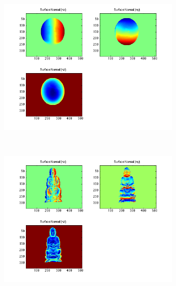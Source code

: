 \documentclass{paper}
\begin{document}
\begin{figure}[h!]
    \centering
    \begin{subfigure}{0.45\textwidth}
        \includegraphics[width=\textwidth]{results/gray/gray_n_xyz}
    \end{subfigure}
    ~
    \begin{subfigure}{0.45\textwidth}
        \includegraphics[width=\textwidth]{results/buddha/buddha_n_xyz}
    \end{subfigure}
    

\end{figure}
\end{document}
